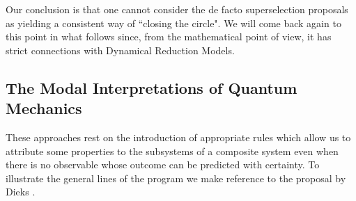\documentclass[10pt,a4paper]{article}
\begin{document}
Our conclusion is that one cannot consider the de facto
superselection proposals as yielding a consistent way of ``closing
the circle". We will come back again to  this point in what follows since,
from the mathematical point of view, it has strict connections with
Dynamical Reduction Models.


\subsection{The Modal Interpretations of Quantum Mechanics}
\label{sec34}

These approaches \cite{mod0,mod1,mod2,mod3,mod4,mod5,vd,bc} rest
on the introduction of appropriate rules which allow us to
attribute some properties to the subsystems of a composite system
even when there is no observable whose outcome can be predicted
with certainty. To illustrate the general lines of the program we
make reference to the proposal by Dieks \cite{mod2}.
\end{document}
